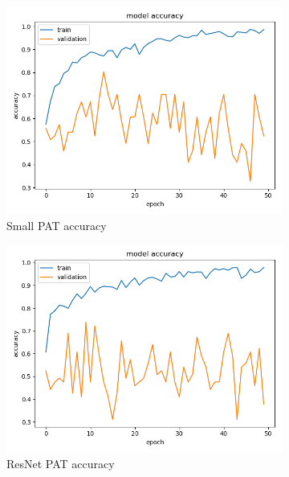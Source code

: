\begin{figure}[h]
\begin{subfigure}[b]{.3\linewidth}
\includegraphics[width=\linewidth]{Figs/small_pat_acc.jpg}
\caption{Small PAT accuracy}
\end{subfigure}
\begin{subfigure}[b]{.3\linewidth}
\includegraphics[width=\linewidth]{Figs/resnet_pat_acc.jpg}
\caption{ResNet PAT accuracy}
\end{subfigure}
\begin{subfigure}[b]{.3\linewidth}

\end{subfigure}
\end{figure}
